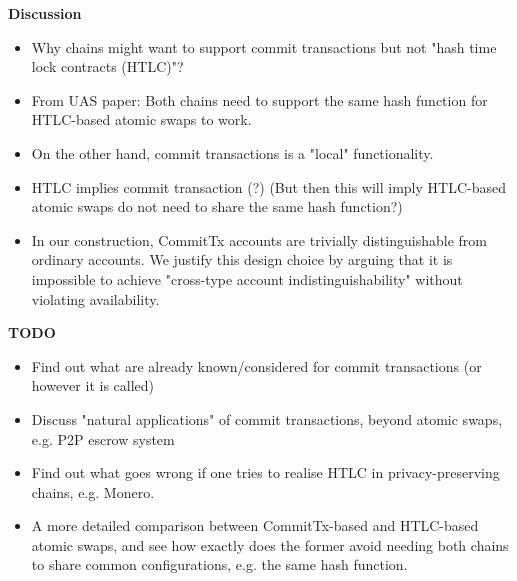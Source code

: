 \documentclass{article}      	%
\begin{document}
\begin{todobox}
\textbf{Discussion}
\begin{itemize}
    \item Why chains might want to support commit transactions but not "hash time lock contracts (HTLC)"? 
    \item From UAS paper: Both chains need to support the same hash function for HTLC-based atomic swaps to work. 
    \item On the other hand, commit transactions is a "local" functionality. 
    \item HTLC implies commit transaction (?) (But then this will imply HTLC-based atomic swaps do not need to share the same hash function?)
    \item In our construction, CommitTx accounts are trivially distinguishable from ordinary accounts. We justify this design choice by arguing that it is impossible to achieve "cross-type account indistinguishability" without violating availability.
\end{itemize}
\textbf{TODO}
\begin{itemize}
    \item Find out what are already known/considered for commit transactions (or however it is called)
    \item Discuss "natural applications" of commit transactions, beyond atomic swaps, e.g. P2P escrow system 
    \item Find out what goes wrong if one tries to realise HTLC in privacy-preserving chains, e.g. Monero.
    \item A more detailed comparison between CommitTx-based and HTLC-based atomic swaps, and see how exactly does the former avoid needing both chains to share common configurations, e.g. the same hash function.
\end{itemize}
\end{todobox}






\end{document}
